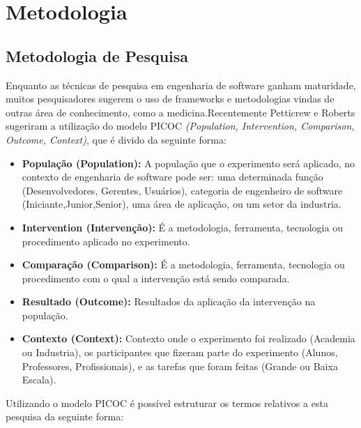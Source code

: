 \chapter{Metodologia}
\label{met}
\section{Metodologia de Pesquisa}
\label{met:pes}
Enquanto as técnicas de pesquisa em engenharia de software
ganham maturidade, muitos pesquisadores sugerem o uso de frameworks e metodologias
vindas de outras área de conhecimento, como a medicina\cite{guidelines}.Recentemente
Petticrew e Roberts sugeriram a utilização do modelo PICOC \textit{(Population,
Intervention, Comparison, Outcome, Context)}, que é divido da seguinte forma\cite{petticrew}:

\begin{itemize}
    \item \textbf{População (Population):} A população que o experimento será
        aplicado, no contexto de engenharia de software pode ser: uma determinada
        função (Desenvolvedores, Gerentes, Usuários), categoria de engenheiro de
        software (Iniciante,Junior,Senior), uma área de aplicação, ou um setor
        da industria.
    \item \textbf{Intervention (Intervenção):} É a metodologia, ferramenta,
        tecnologia ou procedimento aplicado no experimento.
    \item \textbf{Comparação (Comparison):} É a metodologia, ferramenta,
        tecnologia ou procedimento com o qual a intervenção está sendo comparada.
    \item \textbf{Resultado  (Outcome):} Resultados da aplicação da intervenção na
        população.
    \item \textbf{Contexto (Context):} Contexto onde o experimento foi realizado
        (Academia ou Industria), os participantes que fizeram parte do experimento
        (Alunos, Professores, Profissionais), e as tarefas que foram feitas
        (Grande ou Baixa Escala).
\end{itemize}

Utilizando o modelo PICOC é possível estruturar os termos relativos a esta pesquisa
da seguinte forma:

